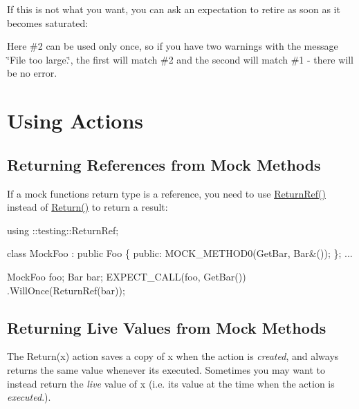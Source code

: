 If this is not what you want, you can ask an expectation to retire as soon as it becomes saturated\+:




Here \#2 can be used only once, so if you have two warnings with the message {\ttfamily \char`\"{}\+File too large.\char`\"{}}, the first will match \#2 and the second will match \#1 -\/ there will be no error.

\section*{Using Actions}

\subsection*{Returning References from Mock Methods}

If a mock function\textquotesingle{}s return type is a reference, you need to use {\ttfamily \hyperlink{namespacetesting_a18eda8fe9c89ee856c199a2e04ca1641}{Return\+Ref()}} instead of {\ttfamily \hyperlink{namespacetesting_af6d1c13e9376c77671e37545cd84359c}{Return()}} to return a result\+:


\begin{DoxyCode}
using ::testing::ReturnRef;

class MockFoo : public Foo \{
 public:
  MOCK\_METHOD0(GetBar, Bar&());
\};
...

  MockFoo foo;
  Bar bar;
  EXPECT\_CALL(foo, GetBar())
      .WillOnce(ReturnRef(bar));
\end{DoxyCode}


\subsection*{Returning Live Values from Mock Methods}

The {\ttfamily Return(x)} action saves a copy of {\ttfamily x} when the action is {\itshape created}, and always returns the same value whenever it\textquotesingle{}s executed. Sometimes you may want to instead return the {\itshape live} value of {\ttfamily x} (i.\+e. its value at the time when the action is {\itshape executed}.).

